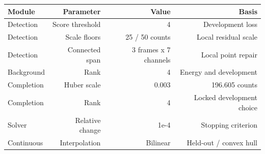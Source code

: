 \begingroup
{}
\begin{tabular}{lrrr}
\toprule
Module & Parameter & Value & Basis \\
\midrule
Detection & Score threshold & 4 & Development loss \\
Detection & Scale floors & 25 / 50 counts & Local residual scale \\
Detection & Connected span & 3 frames x 7 channels & Local point repair \\
Background & Rank & 4 & Energy and development \\
Completion & Huber scale & 0.003 & 196.605 counts \\
Completion & Rank & 4 & Locked development choice \\
Solver & Relative change & 1e-4 & Stopping criterion \\
Continuous & Interpolation & Bilinear & Held-out / convex hull \\
\bottomrule
\end{tabular}
\endgroup
